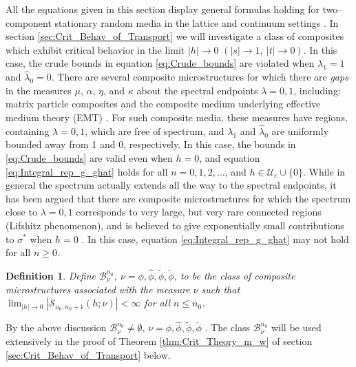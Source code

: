 \documentclass[english,12pt,jmp,graphicx]{revtex4-1}
\newtheorem{definition}{Definition}[section]
\newcommand{\ph}{\hat{\phi}}
\newcommand{\pt}{\tilde{\phi}}
\newcommand{\pc}{\check{\phi}}
\begin{document}
All the equations given in this section display general formulas
holding for two--component stationary random media in the lattice and
continuum settings \cite{Golden:PRL-3935}. In section
\ref{sec:Crit_Behav_of_Transport} we will investigate a class of
composites which exhibit critical behavior in the limit $|h|\to0$
$(|s|\to1, \ |t|\to0)$. In this case, the crude bounds in equation
\eqref{eq:Crude_bounds} are violated when $\lambda_1=1$ and
$\hat{\lambda}_0=0$. There are several composite microstructures for which
there are \emph{gaps} in the measures $\mu$, $\alpha$, $\eta$, and $\kappa$ about
the spectral endpoints $\lambda=0,1$, including: matrix particle composites
\cite{Bruno:PRSLA-353} and the composite medium underlying 
effective medium theory (EMT) \cite{MILTON:2002:TC}.
For such composite media, these measures have regions, containing
$\lambda=0,1$, which are free of spectrum, and $\lambda_1$ and $\hat{\lambda}_0$ are
uniformly bounded away from 1 and 0, respectively.
In this case, the bounds in \eqref{eq:Crude_bounds} are valid even
when $h=0$, and equation \eqref{eq:Integral_rep_g_ghat}
holds for all $n=0,1,2,\ldots$, and $h\in\mathcal{U}_\varepsilon\cup\{0\}$. 
While in general the spectrum actually extends all the way to the
spectral endpoints, it has been argued that there are composite
microstructures for which the spectrum close to $\lambda=0,1$ corresponds to
very large, but very rare connected regions (Lifshitz phenomenon), and
is believed to give exponentially small contributions to $\sigma^*$ when
$h=0$ \cite{Clerc:AP-191,Jonckheere_Luck_JPA_1998}. In this case,
equation \eqref{eq:Integral_rep_g_ghat} may not hold for all $n\geq0$. 
%
\begin{definition}\label{def:Bounded_diff_g}
Define $\mathcal{B}_{\nu}^{n_0}$, $\nu=\phi,\ph,\pt,\pc$, to be the class of
composite microstructures associated with the measure $\nu$ such that
$\lim_{|h|\to0}|\mathcal{S}_{n_0,n_0+1}(h;\nu)|<\infty$ for all $n\leq n_0$. 
\end{definition}
%
By the above discussion  $\mathcal{B}_{\nu}^{n_0}\neq\emptyset$, $\nu=\phi,\ph,\pt,\pc$
\cite{Bruno:PRSLA-353,MILTON:2002:TC}.
The class $\mathcal{B}_{\nu}^{n_0}$ will be used
extensively in the proof of Theorem \ref{thm:Crit_Theory_m_w} of
section \ref{sec:Crit_Behav_of_Transport} below.  
% 
\end{document}
